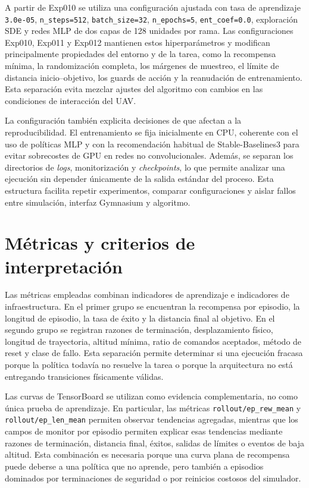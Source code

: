 A partir de Exp010 se utiliza una configuración ajustada con tasa de aprendizaje \texttt{3.0e-05},
\texttt{n\_steps=512}, \texttt{batch\_size=32}, \texttt{n\_epochs=5},
\texttt{ent\_coef=0.0}, exploración SDE y redes MLP de dos capas de 128 unidades
por rama. Las configuraciones Exp010, Exp011 y Exp012 mantienen estos
hiperparámetros y modifican principalmente propiedades del entorno y de la tarea,
como la recompensa mínima, la randomización completa, los márgenes de muestreo,
el límite de distancia inicio--objetivo, los guards de acción y la reanudación de
entrenamiento. Esta separación evita mezclar ajustes del algoritmo con cambios en
las condiciones de interacción del UAV.

La configuración también explicita decisiones de que afectan a la
reproducibilidad. El entrenamiento se fija inicialmente en CPU, coherente con el
uso de políticas MLP y con la recomendación habitual de Stable-Baselines3 para
evitar sobrecostes de GPU en redes no convolucionales. Además, se separan los
directorios de \emph{logs}, monitorización y \emph{checkpoints}, lo que permite
analizar una ejecución sin depender únicamente de la salida estándar del proceso.
Esta estructura facilita repetir experimentos, comparar configuraciones y aislar
fallos entre simulación, interfaz Gymnasium y algoritmo.


\section{Métricas y criterios de interpretación} \label{sct:aplicacion:metricas}

Las métricas empleadas combinan indicadores de aprendizaje e indicadores de
infraestructura. En el primer grupo se encuentran la recompensa por episodio, la
longitud de episodio, la tasa de éxito y la distancia final al objetivo. En el
segundo grupo se registran razones de terminación, desplazamiento físico,
longitud de trayectoria, altitud mínima, ratio de comandos aceptados, método de
reset y clase de fallo. Esta separación permite determinar si una ejecución
fracasa porque la política todavía no resuelve la tarea o porque la arquitectura no
está entregando transiciones físicamente válidas.

Las curvas de TensorBoard se utilizan como evidencia complementaria, no como
única prueba de aprendizaje. En particular, las métricas
\texttt{rollout/ep\_rew\_mean} y \texttt{rollout/ep\_len\_mean} permiten
observar tendencias agregadas, mientras que los campos de monitor por episodio
permiten explicar esas tendencias mediante razones de terminación, distancia
final, éxitos, salidas de límites o eventos de baja altitud. Esta combinación es
necesaria porque una curva plana de recompensa puede deberse a una política que
no aprende, pero también a episodios dominados por terminaciones de seguridad o
por reinicios costosos del simulador.

